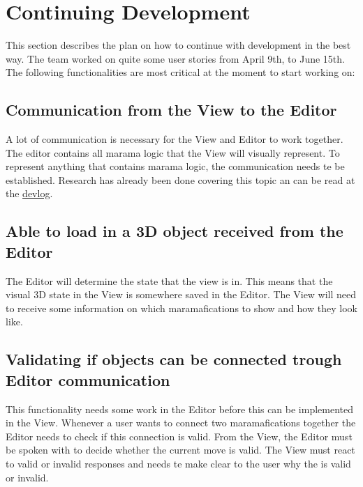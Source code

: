 \documentclass[10pt]{extarticle} %
\begin{document}
    \section{Continuing Development}
    This section describes the plan on how to continue with development in the best way.
    The team worked on quite some user stories from April 9th, to June 15th.
    The following functionalities are most critical at the moment to start working on:
    \subsection{Communication from the View to the Editor}
    A lot of communication is necessary for the View and Editor to work together.
    The editor contains all marama logic that the View will visually represent.
    To represent anything that contains marama logic, the communication needs te be established.
    Research has already been done covering this topic an can be read at the \href{https://docs.google.com/document/d/1Y8Otrf0bv8S2L_Sy8z_-9-9obVQ05sHg25_af-n7i4U/edit}{devlog}.
    \subsection{Able to load in a 3D object received from the Editor}
    The Editor will determine the state that the view is in.
    This means that the visual 3D state in the View is somewhere saved in the Editor.
    The View will need to receive some information on which maramafications to show and how they look like.
    \subsection{Validating if objects can be connected trough Editor communication}
    This functionality needs some work in the Editor before this can be implemented in the View.
    Whenever a user wants to connect two maramafications together the Editor needs to check if this connection is valid.
    From the View, the Editor must be spoken with to decide whether the current move is valid.
    The View must react to valid or invalid responses and needs te make clear to the user why the is valid or invalid.
    \newpage
    
\end{document}
